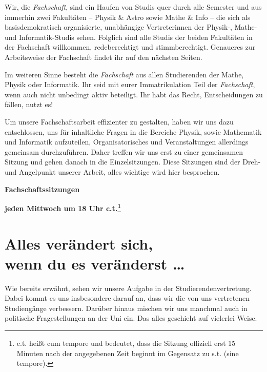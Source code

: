 Wir, die \emph{Fachschaft}, sind ein Haufen von Studis quer durch alle Semester und aus immerhin zwei Fakultäten -- Physik \& Astro sowie Mathe \& Info -- die sich als basisdemokratisch organisierte, unabhängige Vertreterinnen der Physik-, Mathe- und Informatik-Studis sehen. Folglich sind alle Studis der beiden Fakultäten in der Fachschaft willkommen, redeberechtigt und stimmberechtigt. Genaueres zur Arbeitsweise der Fachschaft findet ihr auf den nächsten Seiten.

Im weiteren Sinne besteht die \emph{Fachschaft} aus allen Studierenden der Mathe, Physik oder Informatik. Ihr seid mit eurer Immatrikulation Teil der \emph{Fachschaft}, wenn auch nicht unbedingt aktiv beteiligt. Ihr habt das Recht, Entscheidungen zu fällen, nutzt es!

Um unsere Fachschaftsarbeit effizienter zu gestalten, haben wir uns dazu entschlossen, uns für inhaltliche Fragen in die Bereiche Physik, sowie Mathematik und Informatik aufzuteilen, Organisatorisches und Veranstaltungen allerdings gemeinsam durchzuführen. Daher treffen wir uns erst zu einer gemeinsamen Sitzung und gehen danach in die Einzelsitzungen. Diese Sitzungen sind der Dreh- und Angelpunkt unserer Arbeit, alles wichtige wird hier besprochen.

\begin{center}
    \large \textbf{Fachschaftssitzungen}

    \textbf{jeden Mittwoch um 18 Uhr \gls{c.t.}\footnote{c.t. heißt cum tempore und bedeutet, dass die Sitzung offiziell erst 15 Minuten nach der angegebenen Zeit beginnt im Gegensatz zu s.t. (sine tempore).}}

\end{center}
\begin{figure}[b]

\end{figure}

\section[Alles verändert sich, wenn du es veränderst \dots]{Alles verändert sich, \\wenn du es veränderst \dots}
Wie bereits erwähnt, sehen wir unsere Aufgabe in der Studierendenvertretung. Dabei kommt es uns insbesondere darauf an, dass wir die von uns vertretenen Studiengänge verbessern. Darüber hinaus mischen wir uns manchmal auch in politische Fragestellungen an der Uni ein. Das alles geschieht auf vielerlei Weise.

